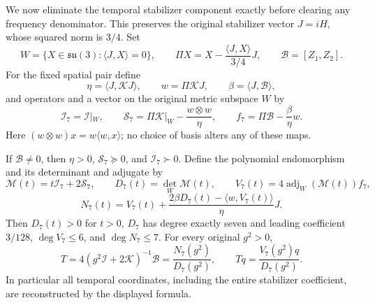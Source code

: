 We now eliminate the temporal stabilizer component exactly before
clearing any frequency denominator. This preserves the original
stabilizer vector $J=iH$, whose squared norm is $3/4$.
Set
\[
 W=\{X\in\mathfrak{su}(3):\langle J,X\rangle=0\},\qquad
 \Pi X=X-\frac{\langle J,X\rangle}{3/4}J,
 \qquad \mathscr B=[Z_1,Z_2].
\]
For the fixed spatial pair define
\[
 \eta=\langle J,\mathcal KJ\rangle,\qquad
 w=\Pi\mathcal KJ,\qquad \beta=\langle J,\mathscr B\rangle,
\]
and operators and a vector on the original metric subspace $W$ by
\[
 \mathcal I_7=\mathcal I|_W,\qquad
 \mathcal S_7=\Pi\mathcal K|_W-\frac{w\otimes w}{\eta},\qquad
 f_7=\Pi\mathscr B-\frac{\beta}{\eta}w.
\]
Here $(w\otimes w)x=w\langle w,x\rangle$; no choice of basis
alters any of these maps.

\begin{lemma}
\label{q444:finite-coupling-schur}
If $\mathscr B\ne0$, then $\eta>0$, $\mathcal S_7\succeq0$, and
$\mathcal I_7\succ0$. Define the polynomial endomorphism and its
determinant and adjugate by
\[
 \mathscr M(t)=t\mathcal I_7+2\mathcal S_7,\qquad
 D_7(t)=\det_W\mathscr M(t),\qquad
 V_7(t)=4\operatorname{adj}_W(\mathscr M(t))f_7,
\]
\begin{equation}
 N_7(t)=V_7(t)+
       \frac{2\beta D_7(t)-\langle w,V_7(t)\rangle}{\eta}J.
 \label{q444:finite-coupling-N}
\end{equation}
Then $D_7(t)>0$ for $t>0$, $D_7$ has degree exactly seven and leading
coefficient $3/128$, $\deg V_7\le6$, and $\deg N_7\le7$.
For every original $g^2>0$,
\begin{equation}
 T=4(g^2\mathcal I+2\mathcal K)^{-1}\mathscr B
   =\frac{N_7(g^2)}{D_7(g^2)},\qquad
 Tq=\frac{V_7(g^2)q}{D_7(g^2)}.
 \label{q444:finite-coupling-T}
\end{equation}
In particular all temporal coordinates, including the entire stabilizer
coefficient, are reconstructed by the displayed formula.
\end{lemma}
